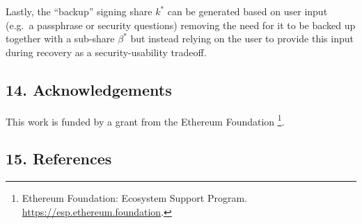 \documentclass[
]{article}
\begin{document}
Lastly, the ``backup'' signing share \(k^ \ast\) can be generated based
on user input (e.g.~a passphrase or security questions) removing the
need for it to be backed up together with a sub-share \(\beta ^ \ast\)
but instead relying on the user to provide this input during recovery as
a security-usability tradeoff.

\hypertarget{acknowledgements}{%
\subsection{14. Acknowledgements}\label{acknowledgements}}

This work is funded by a grant from the Ethereum Foundation \footnote{Ethereum
  Foundation: Ecosystem Support Program.
  \url{https://esp.ethereum.foundation}.}.

\hypertarget{references}{%
\subsection{15. References}\label{references}}
\end{document}
